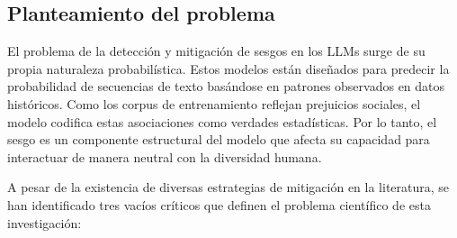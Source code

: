 \documentclass[12pt,a4paper]{report}
\begin{document}
\subsection{Planteamiento del problema}
\label{subsec:planteamiento_del_problema}

El problema de la detección y mitigación de sesgos en los LLMs surge de su propia naturaleza probabilística. Estos modelos están diseñados para predecir la probabilidad de secuencias de texto basándose en patrones observados en datos históricos. Como los corpus de entrenamiento reflejan prejuicios sociales, el modelo codifica estas asociaciones como verdades estadísticas. Por lo tanto, el sesgo es un componente estructural del modelo que afecta su capacidad para interactuar de manera neutral con la diversidad humana.

A pesar de la existencia de diversas estrategias de mitigación en la literatura, se han identificado tres vacíos críticos que definen el problema científico de esta investigación:
\end{document}
